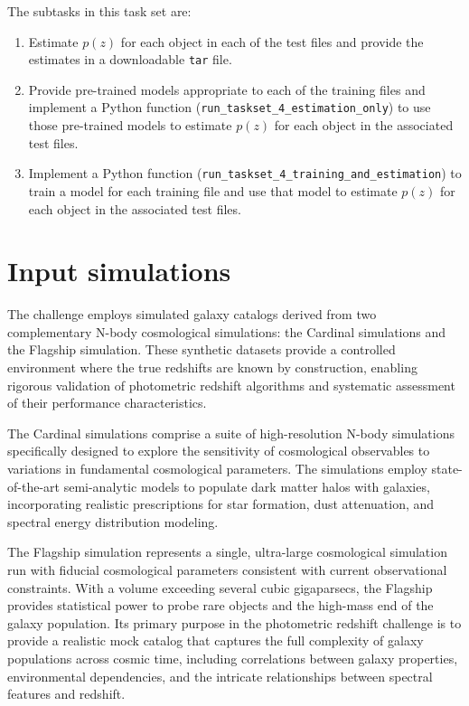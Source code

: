 \documentclass[11pt,twoside,letterpaper,onecolumn,english]{article}
\begin{document}
The subtasks in this task set are:

\begin{enumerate}
  \item{Estimate $p(z)$ for each object in each of the test files and
      provide the estimates in a downloadable \texttt{tar} file.}
  \item{Provide pre-trained models appropriate to each of the training
      files and implement a Python function
      (\texttt{run\_taskset\_4\_estimation\_only}) to use those
      pre-trained models to estimate $p(z)$ for each object in the
      associated test files.}    
  \item{Implement a Python function
      (\texttt{run\_taskset\_4\_training\_and\_estimation}) to train a model for
      each training file and use that model to estimate $p(z)$ for
      each object in the associated test files.}    
\end{enumerate}


\appendix


\section{Input simulations}
\label{sec:input_sims}

The challenge employs simulated galaxy catalogs derived from two
complementary N-body cosmological simulations: the Cardinal
simulations and the Flagship simulation. These synthetic datasets
provide a controlled environment where the true redshifts are known by
construction, enabling rigorous validation of photometric redshift
algorithms and systematic assessment of their performance
characteristics.

The Cardinal simulations comprise a suite of high-resolution N-body
simulations specifically designed to explore the sensitivity of
cosmological observables to variations in fundamental cosmological
parameters. The simulations employ state-of-the-art semi-analytic
models to populate dark matter halos with galaxies, incorporating
realistic prescriptions for star formation, dust attenuation, and
spectral energy distribution modeling.

The Flagship simulation represents a single, ultra-large cosmological
simulation run with fiducial cosmological parameters consistent with
current observational constraints. With a volume exceeding several
cubic gigaparsecs, the Flagship provides statistical power to probe
rare objects and the high-mass end of the galaxy population. Its
primary purpose in the photometric redshift challenge is to provide a
realistic mock catalog that captures the full complexity of galaxy
populations across cosmic time, including correlations between galaxy
properties, environmental dependencies, and the intricate
relationships between spectral features and redshift.
\end{document}
